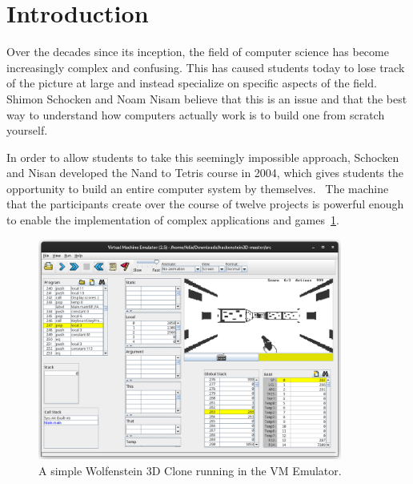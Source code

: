 \section{Introduction}
Over the decades since its inception, the field of computer science has become increasingly complex and confusing.
This has caused students today to lose track of the picture at large and instead specialize on specific aspects of the field.
Shimon Schocken and Noam Nisam believe that this is an issue and that the best way to understand how computers actually work is to build one from scratch yourself.~\cite[Preface]{nisan2005}

In order to allow students to take this seemingly impossible approach, Schocken and Nisan developed the Nand to Tetris course in 2004, which gives students the opportunity to build an entire computer system by themselves.~\cite{1408798}
The machine that the participants create over the course of twelve projects is powerful enough to enable the implementation of complex applications and games~\ref{fig:hackenstein-official}.

\begin{center}
  \begin{figure}[ht]
    \centering
    \includegraphics[width=10cm]{fig/hackenstein-official.png}
    \caption{A simple Wolfenstein 3D Clone running in the VM Emulator.}%
    \label{fig:hackenstein-official}
  \end{figure}
\end{center}


